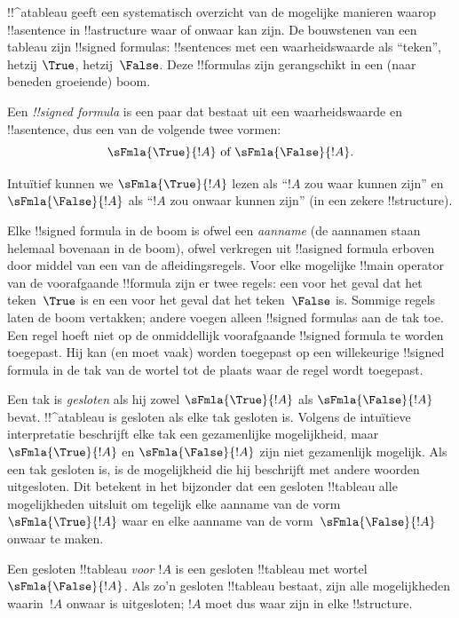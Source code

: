 \documentclass[../../../include/open-logic-section]{subfiles}
\begin{document}
      {}
      {}


!!^a{tableau} geeft een systematisch overzicht van de mogelijke
manieren waarop !!a{sentence} in !!a{structure} waar of onwaar kan
zijn. De bouwstenen van een tableau zijn !!{signed formula}s:
!!{sentence}s met een waarheidswaarde als ``teken'', hetzij $\True$,
hetzij~$\False$. Deze !!{formula}s zijn gerangschikt in een (naar
beneden groeiende) boom.

\begin{defn}
  Een \emph{!!{signed formula}} is een paar dat bestaat uit een
  waarheidswaarde en !!a{sentence}, dus een van de volgende twee
  vormen:
  \[
  \sFmla{\True}{!A} \text{ of } \sFmla{\False}{!A}.
  \]
\end{defn}

Intuïtief kunnen we $\sFmla{\True}{!A}$ lezen als ``$!A$ zou waar
kunnen zijn'' en $\sFmla{\False}{!A}$ als ``$!A$ zou onwaar kunnen
zijn'' (in een zekere !!{structure}).

Elke !!{signed formula} in de boom is ofwel een \emph{aanname} (de
aannamen staan helemaal bovenaan in de boom), ofwel verkregen uit
!!a{signed formula} erboven door middel van een van de
afleidingsregels. Voor elke mogelijke !!{main operator} van de
voorafgaande !!{formula} zijn er twee regels: een voor het geval dat
het teken~$\True$ is en een voor het geval dat het teken~$\False$ is.
Sommige regels laten de boom vertakken; andere voegen alleen
!!{signed formula}s aan de tak toe. Een regel hoeft niet op de
onmiddellijk voorafgaande !!{signed formula} te worden toegepast. Hij
kan (en moet vaak) worden toegepast op een willekeurige !!{signed
formula} in de tak van de wortel tot de plaats waar de regel wordt
toegepast.

Een tak is \emph{gesloten} als hij zowel $\sFmla{\True}{!A}$ als
$\sFmla{\False}{!A}$ bevat. !!^a{tableau} is gesloten als elke tak
gesloten is. Volgens de intuïtieve interpretatie beschrijft elke tak
een gezamenlijke mogelijkheid, maar $\sFmla{\True}{!A}$ en
$\sFmla{\False}{!A}$ zijn niet gezamenlijk mogelijk. Als een tak
gesloten is, is de mogelijkheid die hij beschrijft met andere woorden
uitgesloten. Dit betekent in het bijzonder dat een gesloten
!!{tableau} alle mogelijkheden uitsluit om tegelijk elke aanname van
de vorm $\sFmla{\True}{!A}$ waar en elke aanname van de
vorm~$\sFmla{\False}{!A}$ onwaar te maken.

Een gesloten !!{tableau} \emph{voor $!A$} is een gesloten
!!{tableau} met wortel~$\sFmla{\False}{!A}$. Als zo'n gesloten
!!{tableau} bestaat, zijn alle mogelijkheden waarin~$!A$ onwaar is
uitgesloten; $!A$ moet dus waar zijn in elke !!{structure}.
\end{document}
